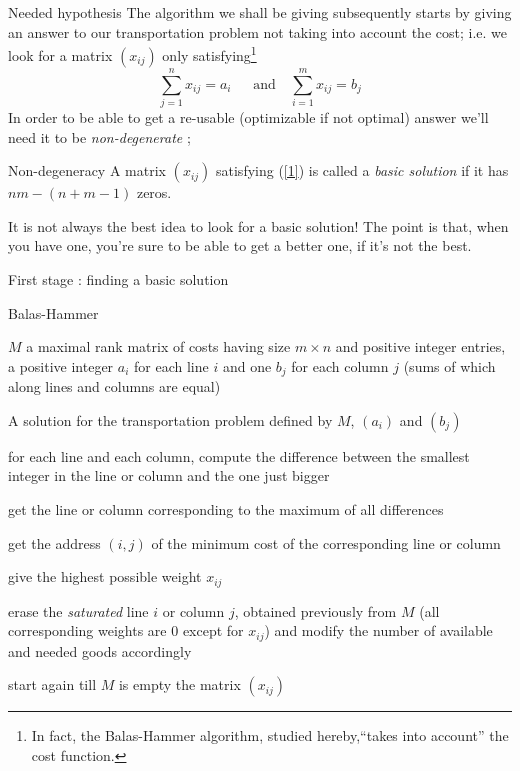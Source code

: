 \documentclass[32pt,aspectratio=169]{beamer}
\begin{document}
\begin{frame}{Needed hypothesis}
  The algorithm we shall be giving subsequently starts by giving an
  answer to our transportation problem not taking into account the
  cost; i.e. we look for a matrix $(x_{ij})$ only
  satisfying\footnote{In fact, the Balas-Hammer algorithm, studied
    hereby,``takes into account'' the cost function.}
  \begin{equation}
    \label{1}
    \tag{$\star$}
    \sum_{j=1}^n x_{ij} = a_i\;\; \quad \text{and} \quad \sum_{i=1}^m x_{ij} = b_j
  \end{equation}
  In order to be able to get a re-usable (optimizable if not optimal)
  answer we'll need it to be \emph{non-degenerate} ;
  \begin{alertblock}{Non-degeneracy}
    A matrix $(x_{ij})$ satisfying (\ref{1}) is called a \emph{basic
      solution} if it has $nm - (n+m-1)$ zeros.
  \end{alertblock}
  \begin{rem}
    It is not always the best idea to look for a basic solution! The
    point is that, when you have one, you're sure to be able to get a
    better one, if it's not the best.
  \end{rem}
\end{frame}

\begin{frame}{First stage : finding a basic solution}
  \begin{algorithm}[H]
    \caption{Balas-Hammer}
    \small{
      \begin{algorithmic}[1]
       \Statex
       
       \Require $M$ a maximal rank matrix of costs having size
       $m \times n$ and positive integer entries, a positive integer
       $a_i$ for each line $i$ and one $b_j$ for each column $j$ (sums
       of which along lines and columns are equal)

       \Ensure A solution for the transportation problem defined
       by $M$, $(a_i)$ and $(b_j)$
       \Statex

       \State for each line and each column, compute the difference
       between the smallest integer in the line or column and the one
       just bigger
       
       \State get the line or column corresponding to the maximum of all differences
 
       \State get the address $(i, j)$ of the minimum cost of the
       corresponding line or column

       \State give the highest possible weight $x_{ij}$ 
       
       \State erase the \emph{saturated} line $i$ or column $j$,
       obtained previously from $M$ (all corresponding weights are $0$
       except for $x_{ij}$) and modify the number of available and needed goods
       accordingly

       \State start again till $M$ is empty
       \State \Return the matrix $(x_{ij})$

     \end{algorithmic}
     }
    \end{algorithm}
\end{frame}
\end{document}
